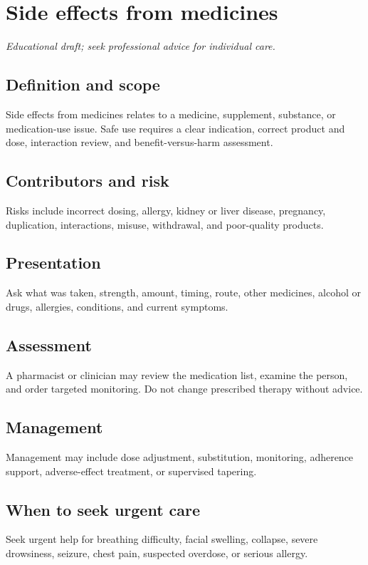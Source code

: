 \chapter{Side effects from medicines}
\medskip
\noindent\textit{Educational draft; seek professional advice for individual care.}

\section*{Definition and scope}
Side effects from medicines relates to a medicine, supplement, substance, or medication-use issue. Safe use requires a clear indication, correct product and dose, interaction review, and benefit-versus-harm assessment.

\section*{Contributors and risk}
Risks include incorrect dosing, allergy, kidney or liver disease, pregnancy, duplication, interactions, misuse, withdrawal, and poor-quality products.

\section*{Presentation}
Ask what was taken, strength, amount, timing, route, other medicines, alcohol or drugs, allergies, conditions, and current symptoms.

\section*{Assessment}
A pharmacist or clinician may review the medication list, examine the person, and order targeted monitoring. Do not change prescribed therapy without advice.

\section*{Management}
Management may include dose adjustment, substitution, monitoring, adherence support, adverse-effect treatment, or supervised tapering.

\section*{When to seek urgent care}
Seek urgent help for breathing difficulty, facial swelling, collapse, severe drowsiness, seizure, chest pain, suspected overdose, or serious allergy.

